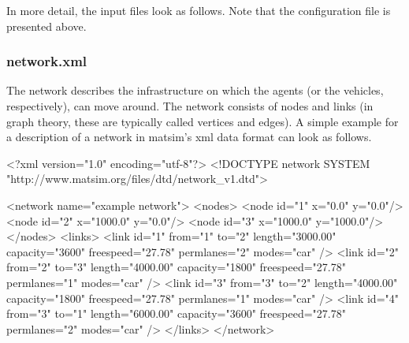 In more detail, the input files look as follows. Note that the configuration file is presented above.

\subsubsection{network.xml}
The network describes the infrastructure on which the agents (or the vehicles, respectively), can move around. The network consists of \glspl{node} and \glspl{link} (in graph theory, these are typically called vertices and edges). A simple example for a description of a network in \gls{matsim}'s \gls{xml} data format can look as follows.

\begin{xml}
<?xml version="1.0" encoding="utf-8"?> 
<!DOCTYPE network SYSTEM "http://www.matsim.org/files/dtd/network_v1.dtd"> 
 
<network name="example network"> 
   <nodes> 
      <node id="1" x="0.0" y="0.0"/> 
      <node id="2" x="1000.0" y="0.0"/> 
      <node id="3" x="1000.0" y="1000.0"/> 
   </nodes> 
   <links> 
      <link id="1" from="1" to="2" length="3000.00" capacity="3600" 
                                 freespeed="27.78" permlanes="2" modes="car" /> 
      <link id="2" from="2" to="3" length="4000.00" capacity="1800" 
                                 freespeed="27.78" permlanes="1" modes="car" /> 
      <link id="3" from="3" to="2" length="4000.00" capacity="1800" 
                                 freespeed="27.78" permlanes="1" modes="car" /> 
      <link id="4" from="3" to="1" length="6000.00" capacity="3600" 
                                 freespeed="27.78" permlanes="2" modes="car" /> 
   </links> 
</network>
\end{xml}

